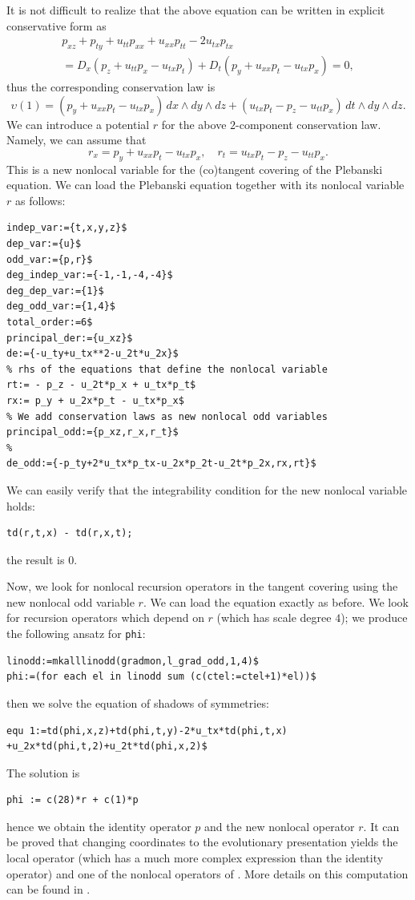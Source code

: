 It is not difficult to realize that the above equation can be written in
explicit conservative form as
\begin{multline*}
    p_{xz}+p_{ty}+u_{tt}p_{xx}+u_{xx}p_{tt}-2u_{tx}p_{tx} \\
    =D_x(p_z+u_{tt}p_x-u_{tx}p_t)+D_t(p_y+u_{xx}p_t-u_{tx}p_x)=0,
\end{multline*}
thus the corresponding conservation law is
\begin{equation}
  \label{eq:32}
  \upsilon(1)= (p_y+u_{xx}p_t-u_{tx}p_x)\,dx\wedge dy\wedge dz+
          (u_{tx}p_t-p_z-u_{tt}p_x)\,dt\wedge dy\wedge dz.
        \end{equation}
We can introduce a potential $r$ for the above $2$-component conservation
law. Namely, we can assume that
\begin{equation}\label{eq:101}
  r_x = p_y+u_{xx}p_t-u_{tx}p_x,\quad r_t = u_{tx}p_t-p_z-u_{tt}p_x.
\end{equation}
This is a new nonlocal variable for the (co)tangent covering of the Plebanski
equation. We can load the Plebanski equation together with its nonlocal
variable $r$ as follows:
\begin{verbatim}
indep_var:={t,x,y,z}$
dep_var:={u}$
odd_var:={p,r}$
deg_indep_var:={-1,-1,-4,-4}$
deg_dep_var:={1}$
deg_odd_var:={1,4}$
total_order:=6$
principal_der:={u_xz}$
de:={-u_ty+u_tx**2-u_2t*u_2x}$
% rhs of the equations that define the nonlocal variable
rt:= - p_z - u_2t*p_x + u_tx*p_t$
rx:= p_y + u_2x*p_t - u_tx*p_x$
% We add conservation laws as new nonlocal odd variables
principal_odd:={p_xz,r_x,r_t}$
%
de_odd:={-p_ty+2*u_tx*p_tx-u_2x*p_2t-u_2t*p_2x,rx,rt}$
\end{verbatim}
We can easily verify that the integrability condition for the new nonlocal
variable holds:
\begin{verbatim}
td(r,t,x) - td(r,x,t);
\end{verbatim}
the result is $0$.

Now, we look for nonlocal recursion operators in the tangent covering using
the new nonlocal odd variable $r$. We can load the equation exactly as before.
We look for recursion operators which depend on $r$ (which has scale degree
$4$); we produce the following ansatz for \texttt{phi}:
\begin{verbatim}
linodd:=mkalllinodd(gradmon,l_grad_odd,1,4)$
phi:=(for each el in linodd sum (c(ctel:=ctel+1)*el))$
\end{verbatim}
then we solve the equation of shadows of symmetries:
\begin{verbatim}
equ 1:=td(phi,x,z)+td(phi,t,y)-2*u_tx*td(phi,t,x)
+u_2x*td(phi,t,2)+u_2t*td(phi,x,2)$
\end{verbatim}
The solution is
\begin{verbatim}
phi := c(28)*r + c(1)*p
\end{verbatim}
hence we obtain the identity operator $p$ and the new
nonlocal operator $r$. It can be proved that
changing coordinates to the evolutionary presentation yields the local operator
(which has a much more complex expression than the identity operator) and one
of the nonlocal operators of \cite{NeyziNutkuSheftel:JPA:2005}. More details on
this computation can be found in \cite{KrasilshchikVerbovetskyVitolo:SPT:2012}.

